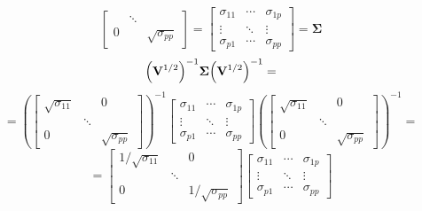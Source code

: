 \begin{enumerate}[font=\bfseries]
\[\begin{bmatrix}
                & \ddots & \\
                0 & & \sqrt{\sigma_{pp}}
            \end{bmatrix}
            =
            \begin{bmatrix}
                \sigma_{11} & \cdots & \sigma_{1p} \\
                \vdots & \ddots & \vdots \\
                \sigma_{p1} & \cdots & \sigma_{pp}
            \end{bmatrix}
            =
            \mathbf{\Sigma}
        \]
        \[
            {\left(\bold{V}^{1/2}\right)}^{-1}\bold{\Sigma}{\left(\bold{V}^{1/2}\right)}^{-1}
            =
        \]
        \[
            =
            {\left(
                \begin{bmatrix}
                    \sqrt{\sigma_{11}} & & 0 \\
                    & \ddots & \\
                    0 & & \sqrt{\sigma_{pp}}
                \end{bmatrix}
            \right)}^{-1}
            \begin{bmatrix}
                \sigma_{11} & \cdots & \sigma_{1p} \\
                \vdots & \ddots & \vdots \\
                \sigma_{p1} & \cdots & \sigma_{pp}
            \end{bmatrix}
            {\left(
                \begin{bmatrix}
                    \sqrt{\sigma_{11}} & & 0 \\
                    & \ddots & \\
                    0 & & \sqrt{\sigma_{pp}}
                \end{bmatrix}
            \right)}^{-1}
            =
        \]
        \[
            =
            \begin{bmatrix}
                1/\sqrt{\sigma_{11}} & & 0 \\
                & \ddots & \\
                0 & & 1/\sqrt{\sigma_{pp}}
            \end{bmatrix}
            \begin{bmatrix}
                \sigma_{11} & \cdots & \sigma_{1p} \\
                \vdots & \ddots & \vdots \\
                \sigma_{p1} & \cdots & \sigma_{pp}
            \end{bmatrix}
\]
\end{enumerate}
